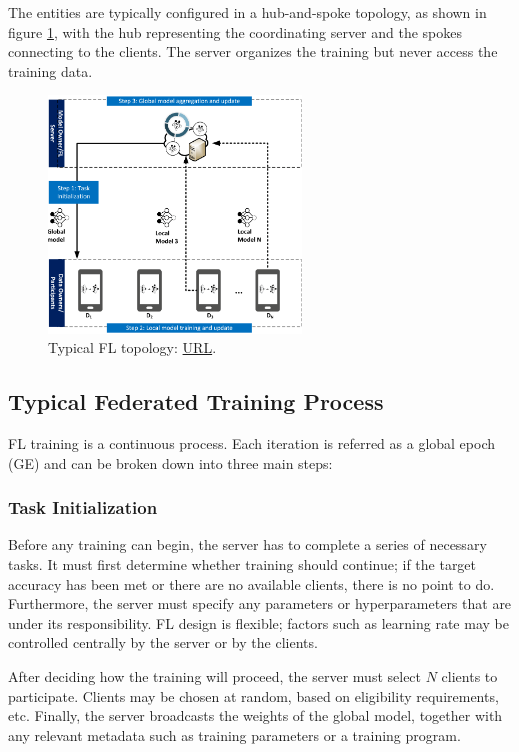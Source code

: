 The entities are typically configured in a hub-and-spoke topology, as shown in figure \ref{fig:FL topology}, with the hub representing the coordinating server and the spokes connecting to the clients. The server organizes the training but never access the training data.
\begin{figure}[H]
    \centering
        \includegraphics[width=0.6\textwidth]{Images/topologies/fl_topology.png}
        \decoRule
        \caption[FL topology]{Typical FL topology: \href{https://ieeexplore.ieee.org/document/9060868}{URL}.}
        \label{fig:FL topology}
\end{figure}

\subsection{Typical Federated Training Process}
FL training is a continuous process. Each iteration is referred as a global epoch (GE) and can be broken down into three main steps:

\subsubsection{Task Initialization}
Before any training can begin, the server has to complete a series of necessary tasks. It must first determine whether training should continue; if the target accuracy has been met or there are no available clients, there is no point to do. Furthermore, the server must specify any parameters or hyperparameters that are under its responsibility. FL design is flexible; factors such as learning rate may be controlled centrally by the server or by the clients.

After deciding how the training will proceed, the server must select \(N\) clients to participate. Clients may be chosen at random, based on eligibility requirements, etc. Finally, the server broadcasts the weights of the global model, together with any relevant metadata such as training parameters or a training program.

